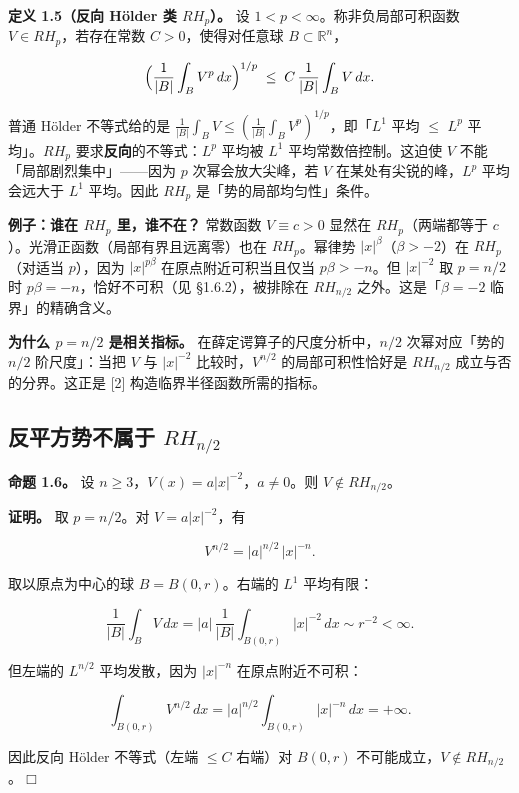 \documentclass[a4paper,11pt,openany]{ctexbook}
\numberwithin{equation}{chapter}
\numberwithin{figure}{chapter}
\numberwithin{table}{chapter}
\begin{document}
\textbf{定义 1.5（反向 Hölder 类 $RH_p$）。} 设 $1<p<\infty$。称非负局部可积函数 $V\in RH_p$，若存在常数 $C>0$，使得对任意球 $B\subset\mathbb R^n$，

$$\Bigl(\frac1{|B|}\int_B V^p\,dx\Bigr)^{1/p}\;\le\; C\,\frac1{|B|}\int_B V\,dx .$$

\begin{intuitionbox}
普通 Hölder 不等式给的是 $\frac1{|B|}\int_B V\le(\frac1{|B|}\int_B V^p)^{1/p}$，即「$L^1$ 平均 $\le$ $L^p$ 平均」。$RH_p$ 要求\textbf{反向}的不等式：$L^p$ 平均被 $L^1$ 平均常数倍控制。这迫使 $V$ 不能「局部剧烈集中」——因为 $p$ 次幂会放大尖峰，若 $V$ 在某处有尖锐的峰，$L^p$ 平均会远大于 $L^1$ 平均。因此 $RH_p$ 是「势的局部均匀性」条件。
\end{intuitionbox}

\textbf{例子：谁在 $RH_p$ 里，谁不在？} 常数函数 $V\equiv c>0$ 显然在 $RH_p$（两端都等于 $c$）。光滑正函数（局部有界且远离零）也在 $RH_p$。幂律势 $|x|^\beta$（$\beta>-2$）在 $RH_p$（对适当 $p$），因为 $|x|^{p\beta}$ 在原点附近可积当且仅当 $p\beta>-n$。但 $|x|^{-2}$ 取 $p=n/2$ 时 $p\beta=-n$，恰好不可积（见 §1.6.2），被排除在 $RH_{n/2}$ 之外。这是「$\beta=-2$ 临界」的精确含义。

\textbf{为什么 $p=n/2$ 是相关指标。} 在薛定谔算子的尺度分析中，$n/2$ 次幂对应「势的 $n/2$ 阶尺度」：当把 $V$ 与 $|x|^{-2}$ 比较时，$V^{n/2}$ 的局部可积性恰好是 $RH_{n/2}$ 成立与否的分界。这正是 [2] 构造临界半径函数所需的指标。

\subsection{反平方势不属于 $RH_{n/2}$}

\textbf{命题 1.6。} 设 $n\ge 3$，$V(x)=a|x|^{-2}$，$a\neq0$。则 $V\notin RH_{n/2}$。

\textbf{证明。} 取 $p=n/2$。对 $V=a|x|^{-2}$，有

$$V^{n/2}=|a|^{n/2}\,|x|^{-n}.$$

取以原点为中心的球 $B=B(0,r)$。右端的 $L^1$ 平均有限：

$$\frac1{|B|}\int_B V\,dx = |a|\,\frac1{|B|}\int_{B(0,r)}|x|^{-2}\,dx \sim r^{-2}<\infty .$$

但左端的 $L^{n/2}$ 平均发散，因为 $|x|^{-n}$ 在原点附近不可积：

$$\int_{B(0,r)} V^{n/2}\,dx = |a|^{n/2}\int_{B(0,r)}|x|^{-n}\,dx = +\infty .$$

因此反向 Hölder 不等式（左端 $\le C$ 右端）对 $B(0,r)$ 不可能成立，$V\notin RH_{n/2}$。$\Box$
\end{document}
